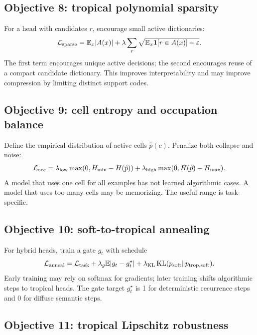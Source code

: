 \documentclass[11pt]{article}
\newcommand{\E}{\mathbb{E}}
\newcommand{\calL}{\mathcal{L}}
\newcommand{\eps}{\varepsilon}
\begin{document}
\subsection{Objective 8: tropical polynomial sparsity}

For a head with candidates \(r\), encourage small active dictionaries:
\begin{equation}
\calL_{\rm sparse}=\E_x |A(x)|+\lambda\sum_r \sqrt{\E_x \mathbf{1}[r\in A(x)]+\eps}.
\end{equation}
The first term encourages unique active decisions; the second encourages reuse of a compact candidate dictionary.  This improves interpretability and may improve compression by limiting distinct support codes.

\subsection{Objective 9: cell entropy and occupation balance}

Define the empirical distribution of active cells \(\hat p(c)\).  Penalize both collapse and noise:
\begin{equation}
\calL_{\rm occ}=\lambda_{\rm low}\max(0,H_{\min}-H(\hat p))+\lambda_{\rm high}\max(0,H(\hat p)-H_{\max}).
\end{equation}
A model that uses one cell for all examples has not learned algorithmic cases.  A model that uses too many cells may be memorizing.  The useful range is task-specific.

\subsection{Objective 10: soft-to-tropical annealing}

For hybrid heads, train a gate \(g_t\) with schedule
\begin{equation}
\calL_{\rm anneal}=\calL_{\rm task}+\lambda_g\E|g_t-g_t^\star|+\lambda_{\rm KL}\operatorname{KL}(p_{\rm soft}\Vert p_{\rm trop,soft}).
\end{equation}
Early training may rely on softmax for gradients; later training shifts algorithmic steps to tropical heads.  The gate target \(g_t^\star\) is 1 for deterministic recurrence steps and 0 for diffuse semantic steps.

\subsection{Objective 11: tropical Lipschitz robustness}
\end{document}
